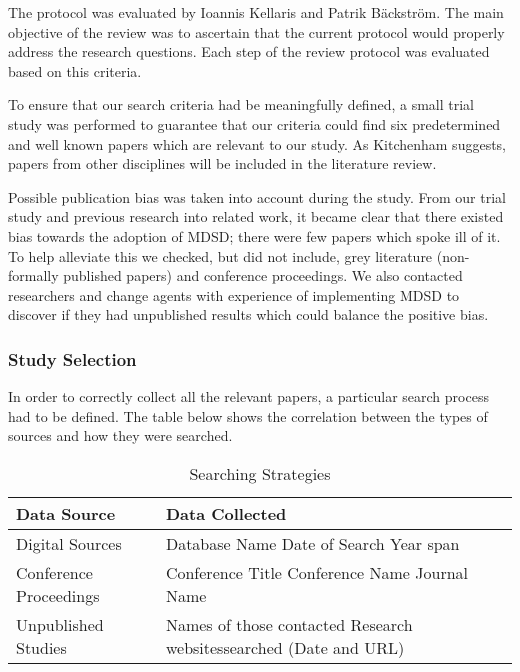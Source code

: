 \documentclass[10pt,twocolumn]{article}
\begin{document}
The protocol was evaluated by Ioannis Kellaris and Patrik B\"ackstr\"om. The main objective of the review was to ascertain that the current protocol would properly address the research questions. Each step of the review protocol was evaluated based on this criteria. 


To ensure that our search criteria had be meaningfully defined, a small trial study was performed to guarantee that our criteria could find six predetermined and well known papers which are relevant to our study. As Kitchenham \cite{kitchenham2007guidelines} suggests, papers from other disciplines will be included in the literature review. 

Possible publication bias was taken into account during the study. From our trial study and previous research into related work, it became clear that there existed bias towards the adoption of MDSD; there were few papers which spoke ill of it. To help alleviate this we checked, but did not include, grey literature (non-formally published papers) and conference proceedings. We also contacted researchers and change agents with experience of implementing MDSD to discover if they had unpublished results which could balance the positive bias. 

\subsubsection{Study Selection}

In order to correctly collect all the relevant papers, a particular search process had to be defined. The table below shows the correlation between the types of sources and how they were searched.

\begin{table}[ht]
	\centering
    \begin{tabular}{ | l | p{3.5cm} |}
    \hline
    \textbf{Data Source} & \textbf{Data Collected} \\ \hline
    Digital Sources & Database Name \newline Date of Search \newline Year span \\ \hline
    Conference Proceedings & Conference Title \newline Conference Name \newline Journal Name \\ \hline
    Unpublished Studies & Names of those contacted \newline Research websites\newline searched (Date and URL) \\
    \hline
    \end{tabular}
	\caption{Searching Strategies}
\end{table}
\end{document}
